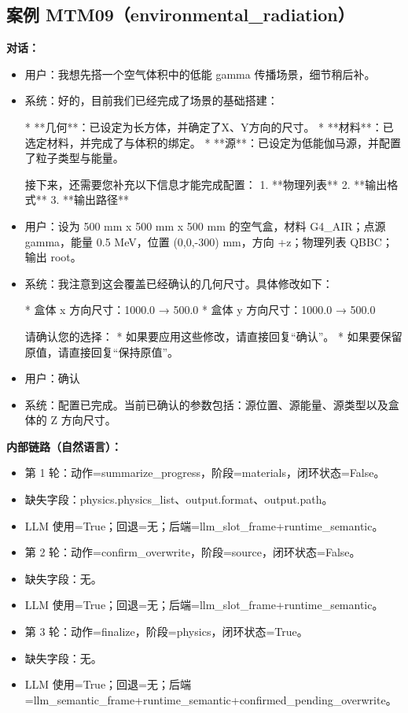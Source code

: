 \documentclass[11pt]{ctexart}
\begin{document}
\subsection{案例 MTM09（environmental\_radiation）}
\textbf{对话：}
\begin{itemize}
\item 用户：我想先搭一个空气体积中的低能 gamma 传播场景，细节稍后补。
\item 系统：好的，目前我们已经完成了场景的基础搭建：

*   **几何**：已设定为长方体，并确定了X、Y方向的尺寸。
*   **材料**：已选定材料，并完成了与体积的绑定。
*   **源**：已设定为低能伽马源，并配置了粒子类型与能量。

接下来，还需要您补充以下信息才能完成配置：
1.  **物理列表**
2.  **输出格式**
3.  **输出路径**
\item 用户：设为 500 mm x 500 mm x 500 mm 的空气盒，材料 G4\_AIR；点源 gamma，能量 0.5 MeV，位置 (0,0,-300) mm，方向 +z；物理列表 QBBC；输出 root。
\item 系统：我注意到这会覆盖已经确认的几何尺寸。具体修改如下：

*   盒体 x 方向尺寸：1000.0 → 500.0
*   盒体 y 方向尺寸：1000.0 → 500.0

请确认您的选择：
*   如果要应用这些修改，请直接回复“确认”。
*   如果要保留原值，请直接回复“保持原值”。
\item 用户：确认
\item 系统：配置已完成。当前已确认的参数包括：源位置、源能量、源类型以及盒体的 Z 方向尺寸。
\end{itemize}
\textbf{内部链路（自然语言）：}
\begin{itemize}
\item 第 1 轮：动作=summarize\_progress，阶段=materials，闭环状态=False。
\item 缺失字段：physics.physics\_list、output.format、output.path。
\item LLM 使用=True；回退=无；后端=llm\_slot\_frame+runtime\_semantic。
\item 第 2 轮：动作=confirm\_overwrite，阶段=source，闭环状态=False。
\item 缺失字段：无。
\item LLM 使用=True；回退=无；后端=llm\_slot\_frame+runtime\_semantic。
\item 第 3 轮：动作=finalize，阶段=physics，闭环状态=True。
\item 缺失字段：无。
\item LLM 使用=True；回退=无；后端=llm\_semantic\_frame+runtime\_semantic+confirmed\_pending\_overwrite。
\end{itemize}
\end{document}
